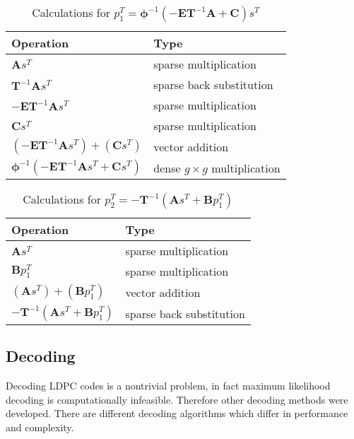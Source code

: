\begin{table}
	\begin{tabular}{l l}
		Operation & Type \\ \toprule
		$\bm{A}s^T$ & sparse multiplication \\
		$\bm{T}^{-1}\bm{A}s^T$ & sparse back substitution \\
		$-\bm{E}\bm{T}^{-1}\bm{A}s^T$ & sparse multiplication \\
		$\bm{C}s^T$ & sparse multiplication \\
		$\left(-\bm{E}\bm{T}^{-1}\bm{A}s^T\right) + \left(\bm{C}s^T\right)$ & vector addition \\
		$\bm{\phi}^{-1}\left(-\bm{E}\bm{T}^{-1}\bm{A}s^T + \bm{C}s^T\right)$ & dense $g\times g$ multiplication\\
	\end{tabular}
	\centering
	\caption{Calculations for $p_1^T = \bm{\phi}^{-1}\left(-\bm{E}\bm{T}^{-1}\bm{A} + \bm{C}\right)s^T$}
\end{table}
\begin{table}
	\begin{tabular}{l l}
		Operation & Type \\ \toprule
		$\bm{A}s^T$ & sparse multiplication \\
		$\bm{B}p_1^T$ & sparse multiplication \\
		$\left(\bm{A}s^T\right) + \left(\bm{B}p_1^T\right)$ & vector addition \\
		$-\bm{T}^{-1}\left(\bm{A}s^T + \bm{B}p_1^T\right)$ & sparse back substitution \\
	\end{tabular}
	\centering
	\caption{Calculations for $p_2^T = -\bm{T}^{-1}\left(\bm{A}s^T + \bm{B}p_1^T\right)$}
\end{table}

\subsection{Decoding}
Decoding LDPC codes is a nontrivial problem, in fact maximum likelihood decoding is computationally infeasible. Therefore other decoding methods were developed. There are different decoding algorithms which differ in performance and complexity.


